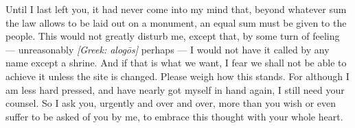 

 Until I last left you, it had never come into my mind that, beyond whatever sum the law allows to be laid out on a monument, an equal sum must be given to the people. This would not greatly disturb me, except that, by some turn of feeling --- unreasonably \textit{[Greek: alog\=os]} perhaps --- I would not have it called by any name except a shrine. And if that is what we want, I fear we shall not be able to achieve it unless the site is changed. Please weigh how this stands. For although I am less hard pressed, and have nearly got myself in hand again, I still need your counsel. So I ask you, urgently and over and over, more than you wish or even suffer to be asked of you by me, to embrace this thought with your whole heart.
